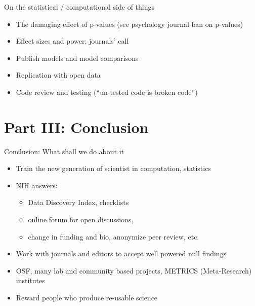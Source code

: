 \documentclass[ignorenonframetext,]{beamer}
\begin{document}
\begin{frame}{On the statistical / computational side of things}

\begin{itemize}[<+->]
\itemsep1pt\parskip0pt
\item
  The damaging effect of p-values (see psychology journal ban on
  p-values)
\item
  Effect sizes and power: journals' call
\item
  Publish models and model comparisons
\item
  Replication with open data
\item
  Code review and testing (``un-tested code is broken code'')
\end{itemize}

\end{frame}

\section{Part III: Conclusion}\label{part-iii-conclusion}

\begin{frame}{Conclusion: What shall we do about it}

\begin{itemize}[<+->]
\itemsep1pt\parskip0pt
\item
  Train the new generation of scientist in computation, statistics
\item
  NIH answers:

  \begin{itemize}[<+->]
  \itemsep1pt\parskip0pt
  \item
    Data Discovery Index, checklists
  \item
    online forum for open discussions,
  \item
    change in funding and bio, anonymize peer review, etc.
  \end{itemize}
\item
  Work with journals and editors to accept well powered null findings
\item
  OSF, many lab and community based projects, METRICS (Meta-Research)
  institutes
\item
  Reward people who produce re-usable science
\end{itemize}

\end{frame}
\end{document}
